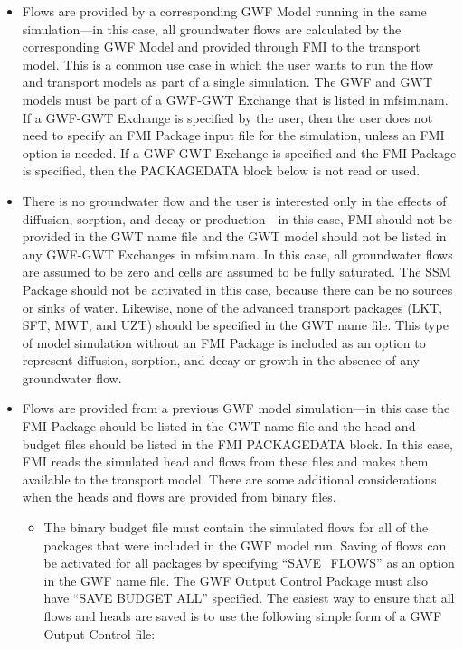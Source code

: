 \begin{itemize}

\item Flows are provided by a corresponding GWF Model running in the same simulation---in this case, all groundwater flows are calculated by the corresponding GWF Model and provided through FMI to the transport model.  This is a common use case in which the user wants to run the flow and transport models as part of a single simulation.  The GWF and GWT models must be part of a GWF-GWT Exchange that is listed in mfsim.nam.  If a GWF-GWT Exchange is specified by the user, then the user does not need to specify an FMI Package input file for the simulation, unless an FMI option is needed.  If a GWF-GWT Exchange is specified and the FMI Package is specified, then the PACKAGEDATA block below is not read or used.

\item There is no groundwater flow and the user is interested only in the effects of diffusion, sorption, and decay or production---in this case, FMI should not be provided in the GWT name file and the GWT model should not be listed in any GWF-GWT Exchanges in mfsim.nam.  In this case, all groundwater flows are assumed to be zero and cells are assumed to be fully saturated.  The SSM Package should not be activated in this case, because there can be no sources or sinks of water.  Likewise, none of the advanced transport packages (LKT, SFT, MWT, and UZT) should be specified in the GWT name file.  This type of model simulation without an FMI Package is included as an option to represent diffusion, sorption, and decay or growth in the absence of any groundwater flow.

\item Flows are provided from a previous GWF model simulation---in this case the FMI Package should be listed in the GWT name file and the head and budget files should be listed in the FMI PACKAGEDATA block.  In this case, FMI reads the simulated head and flows from these files and makes them available to the transport model.  There are some additional considerations when the heads and flows are provided from binary files.

\begin{itemize}
\item The binary budget file must contain the simulated flows for all of the packages that were included in the GWF model run.  Saving of flows can be activated for all packages by specifying ``SAVE\_FLOWS'' as an option in the GWF name file.  The GWF Output Control Package must also have ``SAVE BUDGET ALL'' specified.  The easiest way to ensure that all flows and heads are saved is to use the following simple form of a GWF Output Control file:


\end{itemize}
\end{itemize}
